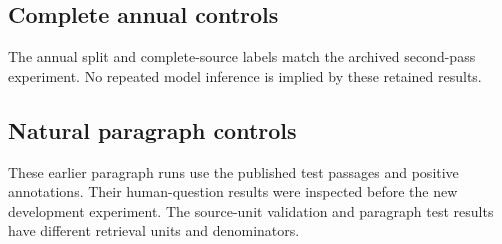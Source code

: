 \subsection{Complete annual controls}


The annual split and complete-source labels match the archived second-pass experiment.
No repeated model inference is implied by these retained results.

\subsection{Natural paragraph controls}

These earlier paragraph runs use the published test passages and positive annotations.
Their human-question results were inspected before the new development experiment.
The source-unit validation and paragraph test results have different retrieval units and denominators.
